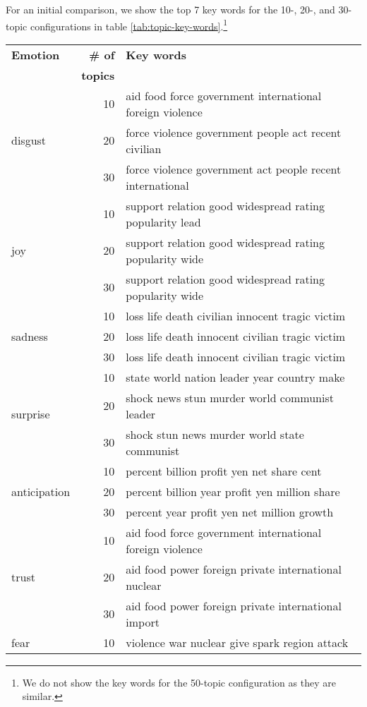 For an initial comparison, we show the top 7 key words for the 10-, 20-, and 30-topic configurations in table \ref{tab:topic-key-words}.\footnote{We do not show the key words for the 50-topic configuration as they are similar.}

\begin{table}[]
\centering
\begin{tabular}{l|r|l}
{\bf Emotion} & {\bf \# of} & {\bf Key words} \\
& {\bf topics} & \\\hline
\multirow{3}{*}{disgust} & 10 & aid food force government international foreign violence\\
 & 20 & force violence government people act recent civilian\\
 & 30 & force violence government act people recent international\\\hline
\multirow{3}{*}{joy} & 10 & support relation good widespread rating popularity lead\\
 & 20 & support relation good widespread rating popularity wide\\
 & 30 & support relation good widespread rating popularity wide\\\hline
\multirow{3}{*}{sadness} & 10 & loss life death civilian innocent tragic victim\\
 & 20 & loss life death innocent civilian tragic victim\\
 & 30 & loss life death innocent civilian tragic victim\\\hline
\multirow{3}{*}{surprise} & 10 & state world nation leader year country make\\
 & 20 & shock news stun murder world communist leader\\
 & 30 & shock stun news murder world state communist\\\hline
\multirow{3}{*}{anticipation} & 10 & percent billion profit yen net share cent\\
 & 20 & percent billion year profit yen million share\\
 & 30 & percent year profit yen net million growth\\\hline
\multirow{3}{*}{trust} & 10 & aid food force government international foreign violence\\
 & 20 & aid food power foreign private international nuclear\\
 & 30 & aid food power foreign private international import\\\hline
\multirow{3}{*}{fear} & 10 & violence war nuclear give spark region attack\\

\end{tabular}
\end{table}

